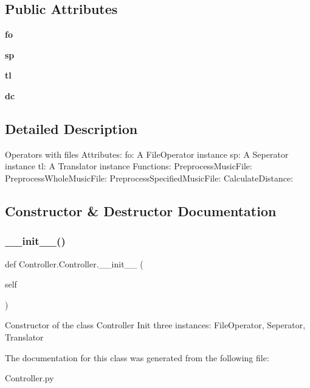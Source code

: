 \subsection*{Public Attributes}
\begin{DoxyCompactItemize}
\item 
\mbox{\label{class_controller_1_1_controller_a9753b697cfc9003ad8f4eeba0ade98cb}} 
{\bfseries fo}
\item 
\mbox{\label{class_controller_1_1_controller_ab35bad52aea51bd17c4704fe778f6c4c}} 
{\bfseries sp}
\item 
\mbox{\label{class_controller_1_1_controller_a29c3187c858572219471a09b56a8ccaf}} 
{\bfseries tl}
\item 
\mbox{\label{class_controller_1_1_controller_a62e9504f2368eb4945136f482c7d51a1}} 
{\bfseries dc}
\end{DoxyCompactItemize}


\subsection{Detailed Description}
\begin{DoxyVerb}Operators with files
Attributes:
    fo: A FileOperator instance
    sp: A Seperator instance
    tl: A Translator instance
Functions:
    PreprocessMusicFile:
    PreprocessWholeMusicFile:
    PreprocessSpecifiedMusicFile:
    CalculateDistance:
\end{DoxyVerb}
 

\subsection{Constructor \& Destructor Documentation}
\mbox{\label{class_controller_1_1_controller_ae584317363efa29ace5c4294ff9675a2}} 
\subsubsection{\texorpdfstring{\+\_\+\+\_\+init\+\_\+\+\_\+()}{\_\_init\_\_()}}
{\footnotesize\ttfamily def Controller.\+Controller.\+\_\+\+\_\+init\+\_\+\+\_\+ (\begin{DoxyParamCaption}\item[{}]{self }\end{DoxyParamCaption})}

\begin{DoxyVerb}Constructor of the class Controller
Init three instances: FileOperator, Seperator, Translator
\end{DoxyVerb}
 

The documentation for this class was generated from the following file\+:\begin{DoxyCompactItemize}
\item 
Controller.\+py\end{DoxyCompactItemize}
